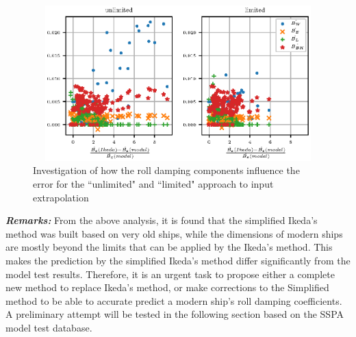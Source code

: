 \begin{figure}[H]
\vspace{-0.5cm}
\centering
  \centering
  \includegraphics[height=6cm, width = 12cm]{figures/ikeda_components.eps}
  \vspace{-0.5cm}
  \caption{Investigation of how the roll damping components influence the error for the ``unlimited" and ``limited" approach to input extrapolation}
  \label{fig:ikeda_components}
\end{figure}

\textbf{\textit{Remarks:}} From the above analysis, it is found that the simplified Ikeda's method was built based on very old ships, while the dimensions of modern ships are mostly beyond the limits that can be applied by the Ikeda's method. This makes the prediction by the simplified Ikeda's method differ significantly from the model test results.
Therefore, it is an urgent task to propose either a complete new method to replace Ikeda's method, or make corrections to the Simplified method to be able to accurate predict a modern ship's roll damping coefficients. A preliminary attempt will be tested in the following section based on the SSPA model test database.